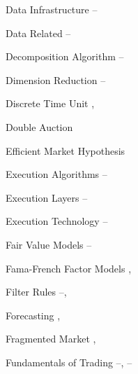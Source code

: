 \begin{multicols}{2}
{Data Infrastructure \hfill \pageref{in:dat_infr1}--\pageref{in:dat_infr2} \par

Data Related \hfill \pageref{in:data_related1}--\pageref{in:data_related2} \par

Decomposition Algorithm \hfill \pageref{in:decomp1}--\pageref{in:decomp2} \par %

Dimension Reduction \hfill \pageref{in:dimred1}--\pageref{in:dimred2} \par

Discrete Time Unit \hfill \pageref{in:disc_time_unit1}, \pageref{in:disc_time_unit2} \par

Double Auction \hfill \pageref{in:double} \pspace





Efficient Market Hypothesis \hfill \pageref{in:efficient} \par

Execution Algorithms \hfill \pageref{in:exec_alg1}--\pageref{in:exec_alg2} \par

Execution Layers \hfill \pageref{in:exec_layer1}--\pageref{in:exec_layer2} \par

Execution Technology \hfill \pageref{in:exec_tech1}--\pageref{in:exec_tech2} \pspace





Fair Value Models \hfill \pageref{in:fvm1}--\pageref{in:fvm2} \par

Fama-French Factor Models \hfill \pageref{in:fama1}, \pageref{in:fama2} \par

Filter Rules \hfill \pageref{in:filter1}--\pageref{in:filter2}, \pageref{in:filter3} \par

Forecasting \hfill \pageref{in:forecast1}, \pageref{in:forecast2} \par

Fragmented Market \hfill \pageref{in:fragmented}, \pageref{in:fragmented_market} \par

Fundamentals of Trading \hfill \pageref{in:fund_trade1}--\pageref{in:fund_trade2}, \pageref{in:fund_trade3}--\pageref{in:fund_trade4} \pspace





}
\end{multicols}
